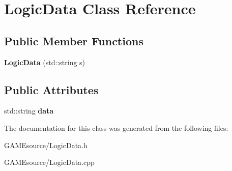 \hypertarget{class_logic_data}{}\section{Logic\+Data Class Reference}
\label{class_logic_data}
\subsection*{Public Member Functions}
\begin{DoxyCompactItemize}
\item 
\mbox{\label{class_logic_data_a182f7a8ffcbb3401e55e2922753c17bb}} 
{\bfseries Logic\+Data} (std\+::string s)
\end{DoxyCompactItemize}
\subsection*{Public Attributes}
\begin{DoxyCompactItemize}
\item 
\mbox{\label{class_logic_data_a59c1bf0acf3ec2ea31d3bbf814740f2e}} 
std\+::string {\bfseries data}
\end{DoxyCompactItemize}


The documentation for this class was generated from the following files\+:\begin{DoxyCompactItemize}
\item 
G\+A\+M\+Esource/Logic\+Data.\+h\item 
G\+A\+M\+Esource/Logic\+Data.\+cpp\end{DoxyCompactItemize}
